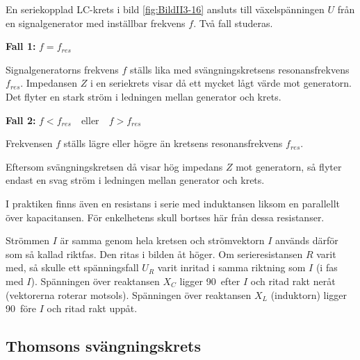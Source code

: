 En seriekopplad LC-krets i bild \ref{fig:BildII3-16} ansluts till
växelspänningen \(U\) från en signalgenerator med inställbar frekvens \(f\).
Två fall studeras.

\textbf{Fall 1:} \(f = f_{res}\)

Signalgeneratorns frekvens \(f\) ställs lika med svängningskretsens
resonansfrekvens \(f_{res}\).
Impedansen \(Z\) i en seriekrets visar då ett mycket lågt värde mot generatorn.
Det flyter en stark ström i ledningen mellan generator och krets.

\textbf{Fall 2:} \(f < f_{res} \quad \text{eller} \quad f > f_{res}\)

Frekvensen \(f\) ställs lägre eller högre än kretsens resonansfrekvens
\(f_{res}\).

Eftersom svängningskretsen då visar hög impedans \(Z\) mot generatorn, så
flyter endast en svag ström i ledningen mellan generator och krets.

I praktiken finns även en resistans i serie med induktansen liksom en
parallellt över kapacitansen.
För enkelhetens skull bortses här från dessa resistanser.

Strömmen \(I\) är samma genom hela kretsen och strömvektorn \(I\) används
därför som så kallad riktfas.
Den ritas i bilden åt höger.
Om serieresistansen \(R\) varit med, så skulle ett spänningsfall \(U_R\) varit
inritad i samma riktning som \(I\) (i fas med \(I\)).
Spänningen över reaktansen \(X_C\) ligger 90\degree~efter \(I\) och ritad
rakt neråt (vektorerna roterar motsols).
Spänningen över reaktansen \(X_L\) (induktorn) ligger 90\degree~före \(I\) och
ritad rakt uppåt.

\subsection{Thomsons svängningskrets}

